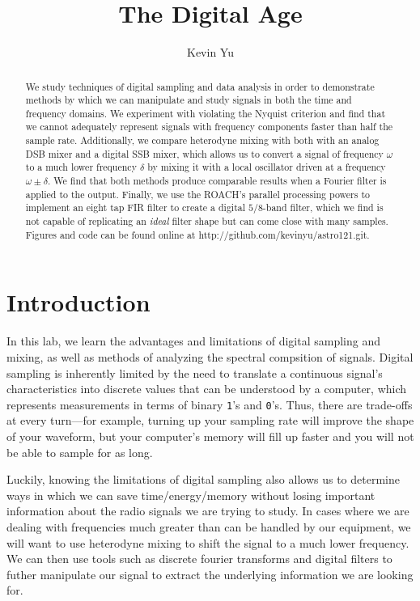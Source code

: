 \documentclass[12pt]{article}
\title{The Digital Age}
\author {
Kevin Yu
}
\begin{document}
\maketitle

\begin{abstract}
We study techniques of digital sampling and data analysis in order to demonstrate methods by which we can manipulate and study signals in both the time and frequency domains. We experiment with violating the Nyquist criterion and find that we cannot adequately represent signals with frequency components faster than half the sample rate. Additionally, we compare  heterodyne mixing with both with an analog DSB mixer and a digital SSB mixer, which allows us to convert a signal of frequency $\omega$ to a much lower frequency $\delta$ by mixing it with a local oscillator driven at a frequency $\omega \pm \delta$. We find that both methods produce comparable results when a Fourier filter is applied to the output. Finally, we use the ROACH's parallel processing powers to implement an eight tap FIR filter to create a digital $5/8$-band filter, which we find is not capable of replicating an \textit{ideal} filter shape but can come close with many samples. Figures and code can be found online at http://github.com/kevinyu/astro121.git. 
\end{abstract}

\section{Introduction}
In this lab, we learn the advantages and limitations of digital sampling and mixing, as well as methods of analyzing the spectral compsition of signals. Digital sampling is inherently limited by the need to translate a continuous signal's characteristics into discrete values that can be understood by a computer, which represents measurements in terms of binary \texttt{1}'s and \texttt{0}'s. Thus, there are trade-offs at every turn---for example, turning up your sampling rate will improve the shape of your waveform, but your computer's memory will fill up faster and you will not be able to sample for as long.

Luckily, knowing the limitations of digital sampling also allows us to determine ways in which we can save time/energy/memory without losing important information about the radio signals we are trying to study. In cases where we are dealing with frequencies much greater than can be handled by our equipment, we will want to use heterodyne mixing to shift the signal to a much lower frequency. We can then use tools such as discrete fourier transforms and digital filters to futher manipulate our signal to extract the underlying information we are looking for.
\end{document}
